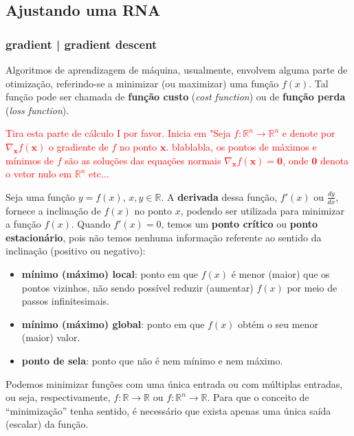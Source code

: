 \documentclass{automatextcc}
\newcommand{\pumi}[1]{\textcolor{red}{#1}}
\newcommand{\R}{\mathds{R}}
\newcommand{\bs}[1]{\boldsymbol{#1}}
\begin{document}


\subsection{Ajustando uma RNA}



\subsubsection{gradient | gradient descent}
Algoritmos de aprendizagem de máquina, usualmente, envolvem alguma parte de otimização, referindo-se a minimizar (ou maximizar) uma função $f(x)$. Tal função pode ser chamada de \textbf{função custo} (\textit{cost function}) ou de \textbf{função perda} (\textit{loss function}). 


\pumi{Tira esta parte de cálculo I por favor. Inicia em "Seja $f:\R^n\rightarrow\R^n$ e denote por $\nabla_{\bs{x}} f(\bs{x})$ o gradiente de $f$ no ponto $\bs x$. blablabla, os pontos de máximos e mínimos de $f$ são as soluções das equações normais $\nabla_{\bs{x}} f(\bs{x})=\bs0$, onde $\bs0$ denota o vetor nulo em $\R^n$ etc...}


Seja uma função $y=f(x)$, $x,y \in \R$. A \textbf{derivada} dessa função, $f'(x)$ ou $\frac{dy}{dx}$, fornece a inclinação de $f(x)$ no ponto $x$, podendo ser utilizada para minimizar a função $f(x)$. Quando $f'(x)=0$, temos um \textbf{ponto crítico} ou \textbf{ponto estacionário}, pois não temos nenhuma informação referente ao sentido da inclinação (positivo ou negativo):
\begin{itemize} %
    \item \textbf{mínimo (máximo) local}: ponto em que $f(x)$ é menor (maior) que os pontos vizinhos, não sendo possível reduzir (aumentar) $f(x)$ por meio de passos infinitesimais.
    \item \textbf{mínimo (máximo) global}: ponto em que $f(x)$ obtém o seu menor (maior) valor.
    \item \textbf{ponto de sela}: ponto que não é nem mínimo e nem máximo.
\end{itemize}
Podemos minimizar funções com uma única entrada ou com múltiplas entradas, ou seja, respectivamente, $f: \R \rightarrow \R$ ou $f: \R^n \rightarrow \R$. Para que o conceito de ``minimização'' tenha sentido, é necessário que exista apenas uma única saída (escalar) da função.
\end{document}
